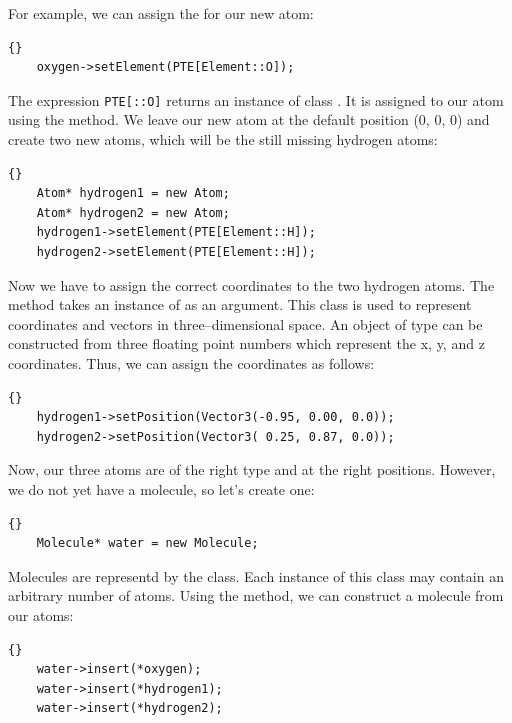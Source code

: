 \noindent
For example, we can assign the  for our new atom:

\begin{lstlisting}{}
	oxygen->setElement(PTE[Element::O]);
\end{lstlisting}

\noindent
The expression {\tt PTE[::O]} returns an instance of class
. It is assigned to our atom using the 
method. We leave our new atom at the default position (0, 0, 0) and create two
new atoms, which will be the still missing hydrogen atoms:

\begin{lstlisting}{}
	Atom* hydrogen1 = new Atom;
	Atom* hydrogen2 = new Atom;
	hydrogen1->setElement(PTE[Element::H]);
	hydrogen2->setElement(PTE[Element::H]);
\end{lstlisting}
	
\noindent
Now we have to assign the correct coordinates to the two hydrogen atoms.  The
method  takes an instance of  as an
argument. This class is used to represent coordinates and vectors in
three--dimensional space. An object of type  can be constructed
from three floating point numbers which represent the x, y, and z coordinates.
Thus, we can assign the coordinates as follows:
 
\begin{lstlisting}{}
 	hydrogen1->setPosition(Vector3(-0.95, 0.00, 0.0));
 	hydrogen2->setPosition(Vector3( 0.25, 0.87, 0.0));
\end{lstlisting}

\noindent

Now, our three atoms are of the right type and at the right positions. However, we
do not yet have a molecule, so let's create one:\\

\begin{lstlisting}{}
	Molecule* water = new Molecule;
\end{lstlisting}

\noindent
Molecules are representd by the  class. Each instance of this
class may contain an arbitrary number of atoms. Using the 
method, we can construct a molecule from our atoms:

\begin{lstlisting}{}
	water->insert(*oxygen);
	water->insert(*hydrogen1);
	water->insert(*hydrogen2);
\end{lstlisting}

